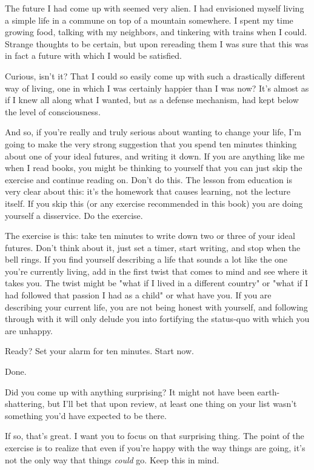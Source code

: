 \documentclass[]{book}
\newcommand{\emphasis}[1]{\textit{#1}}
\begin{document}
The future I had come up with seemed very alien. I had envisioned myself living
a simple life in a commune on top of a mountain somewhere. I spent my time
growing food, talking with my neighbors, and tinkering with trains when I could.
Strange thoughts to be certain, but upon rereading them I was sure that this was
in fact a future with which I would be satisfied.

Curious, isn't it? That I could so easily come up with such a drastically
different way of living, one in which I was certainly happier than I was now?
It's almost as if I knew all along what I wanted, but as a defense mechanism,
had kept below the level of consciousness.

And so, if you're really and truly serious about wanting to change your life,
I'm going to make the very strong suggestion that you spend ten minutes thinking
about one of your ideal futures, and writing it down. If you are anything like
me when I read books, you might be thinking to yourself that you can just skip
the exercise and continue reading on. Don't do this. The lesson from education
is very clear about this: it's the homework that causes learning, not the
lecture itself. If you skip this (or any exercise recommended in this book) you
are doing yourself a disservice. Do the exercise.

The exercise is this: take ten minutes to write down two or three of your ideal
futures. Don't think about it, just set a timer, start writing, and stop when
the bell rings. If you find yourself describing a life that sounds a lot like
the one you're currently living, add in the first twist that comes to mind and
see where it takes you. The twist might be "what if I lived in a different
country" or "what if I had followed that passion I had as a child" or what have
you. If you are describing your current life, you are not being honest with
yourself, and following through with it will only delude you into fortifying the
status-quo with which you are unhappy.

Ready? Set your alarm for ten minutes. Start now.

Done.

Did you come up with anything surprising? It might not have been
earth-shattering, but I'll bet that upon review, at least one thing on your list
wasn't something you'd have expected to be there.

If so, that's great. I want you to focus on that surprising thing. The point of
the exercise is to realize that even if you're happy with the way things are
going, it's not the only way that things \emphasis{could} go. Keep this in mind.
\end{document}

